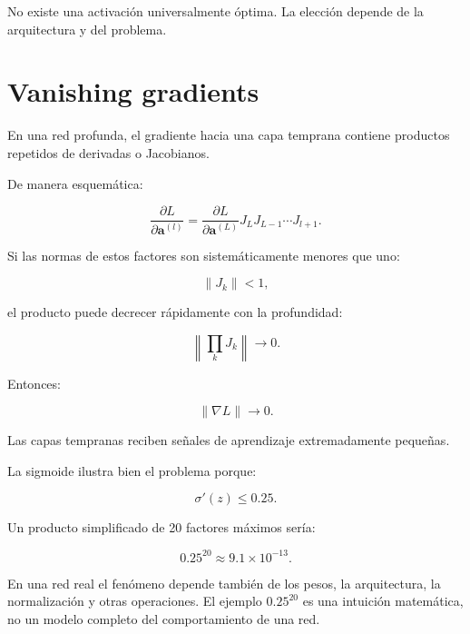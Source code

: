 \documentclass[
  letterpaper,
  DIV=11,
  numbers=noendperiod]{scrartcl}
\begin{document}
No existe una activación universalmente óptima. La elección depende de
la arquitectura y del problema.

\section{Vanishing gradients}\label{vanishing-gradients}

En una red profunda, el gradiente hacia una capa temprana contiene
productos repetidos de derivadas o Jacobianos.

De manera esquemática:

\[
\frac{\partial L}{\partial\mathbf a^{(l)}}
=
\frac{\partial L}{\partial\mathbf a^{(L)}}
J_L
J_{L-1}
\cdots
J_{l+1}.
\]

Si las normas de estos factores son sistemáticamente menores que uno:

\[
\|J_k\|<1,
\]

el producto puede decrecer rápidamente con la profundidad:

\[
\left\|
\prod_k J_k
\right\|
\rightarrow0.
\]

Entonces:

\[
\boxed{
\|\nabla L\|\rightarrow0.
}
\]

Las capas tempranas reciben señales de aprendizaje extremadamente
pequeñas.

La sigmoide ilustra bien el problema porque:

\[
\sigma'(z)\leq0.25.
\]

Un producto simplificado de 20 factores máximos sería:

\[
0.25^{20}
\approx9.1\times10^{-13}.
\]

\begin{tcolorbox}[enhanced jigsaw, arc=.35mm, bottomrule=.15mm, bottomtitle=1mm, breakable, colback=white, colbacktitle=quarto-callout-note-color!10!white, colframe=quarto-callout-note-color-frame, coltitle=black, left=2mm, leftrule=.75mm, opacityback=0, opacitybacktitle=0.6, rightrule=.15mm, title=\textcolor{quarto-callout-note-color}{\faInfo}\hspace{0.5em}{Note}, titlerule=0mm, toprule=.15mm, toptitle=1mm]

En una red real el fenómeno depende también de los pesos, la
arquitectura, la normalización y otras operaciones. El ejemplo
\(0.25^{20}\) es una intuición matemática, no un modelo completo del
comportamiento de una red.

\end{tcolorbox}
\end{document}
